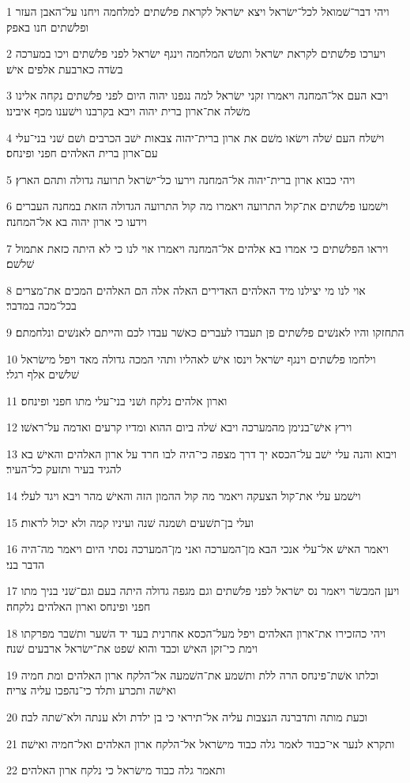 \par 1 ויהי דבר־שׁמואל לכל־ישׂראל ויצא ישׂראל לקראת פלשׁתים למלחמה ויחנו על־האבן העזר ופלשׁתים חנו באפק׃
\par 2 ויערכו פלשׁתים לקראת ישׂראל ותטשׁ המלחמה וינגף ישׂראל לפני פלשׁתים ויכו במערכה בשׂדה כארבעת אלפים אישׁ׃
\par 3 ויבא העם אל־המחנה ויאמרו זקני ישׂראל למה נגפנו יהוה היום לפני פלשׁתים נקחה אלינו משׁלה את־ארון ברית יהוה ויבא בקרבנו וישׁענו מכף איבינו׃
\par 4 וישׁלח העם שׁלה וישׂאו משׁם את ארון ברית־יהוה צבאות ישׁב הכרבים ושׁם שׁני בני־עלי עם־ארון ברית האלהים חפני ופינחס׃
\par 5 ויהי כבוא ארון ברית־יהוה אל־המחנה וירעו כל־ישׂראל תרועה גדולה ותהם הארץ׃
\par 6 וישׁמעו פלשׁתים את־קול התרועה ויאמרו מה קול התרועה הגדולה הזאת במחנה העברים וידעו כי ארון יהוה בא אל־המחנה׃
\par 7 ויראו הפלשׁתים כי אמרו בא אלהים אל־המחנה ויאמרו אוי לנו כי לא היתה כזאת אתמול שׁלשׁם׃
\par 8 אוי לנו מי יצילנו מיד האלהים האדירים האלה אלה הם האלהים המכים את־מצרים בכל־מכה במדבר׃
\par 9 התחזקו והיו לאנשׁים פלשׁתים פן תעבדו לעברים כאשׁר עבדו לכם והייתם לאנשׁים ונלחמתם׃
\par 10 וילחמו פלשׁתים וינגף ישׂראל וינסו אישׁ לאהליו ותהי המכה גדולה מאד ויפל מישׂראל שׁלשׁים אלף רגלי׃
\par 11 וארון אלהים נלקח ושׁני בני־עלי מתו חפני ופינחס׃
\par 12 וירץ אישׁ־בנימן מהמערכה ויבא שׁלה ביום ההוא ומדיו קרעים ואדמה על־ראשׁו׃
\par 13 ויבוא והנה עלי ישׁב על־הכסא יך דרך מצפה כי־היה לבו חרד על ארון האלהים והאישׁ בא להגיד בעיר ותזעק כל־העיר׃
\par 14 וישׁמע עלי את־קול הצעקה ויאמר מה קול ההמון הזה והאישׁ מהר ויבא ויגד לעלי׃
\par 15 ועלי בן־תשׁעים ושׁמנה שׁנה ועיניו קמה ולא יכול לראות׃
\par 16 ויאמר האישׁ אל־עלי אנכי הבא מן־המערכה ואני מן־המערכה נסתי היום ויאמר מה־היה הדבר בני׃
\par 17 ויען המבשׂר ויאמר נס ישׂראל לפני פלשׁתים וגם מגפה גדולה היתה בעם וגם־שׁני בניך מתו חפני ופינחס וארון האלהים נלקחה׃
\par 18 ויהי כהזכירו את־ארון האלהים ויפל מעל־הכסא אחרנית בעד יד השׁער ותשׁבר מפרקתו וימת כי־זקן האישׁ וכבד והוא שׁפט את־ישׂראל ארבעים שׁנה׃
\par 19 וכלתו אשׁת־פינחס הרה ללת ותשׁמע את־השׁמעה אל־הלקח ארון האלהים ומת חמיה ואישׁה ותכרע ותלד כי־נהפכו עליה צריה׃
\par 20 וכעת מותה ותדברנה הנצבות עליה אל־תיראי כי בן ילדת ולא ענתה ולא־שׁתה לבה׃
\par 21 ותקרא לנער אי־כבוד לאמר גלה כבוד מישׂראל אל־הלקח ארון האלהים ואל־חמיה ואישׁה׃
\par 22 ותאמר גלה כבוד מישׂראל כי נלקח ארון האלהים׃

